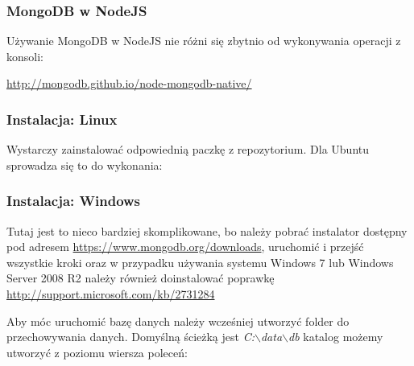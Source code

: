 \documentclass{beamer}
\begin{document}
  \begin{frame}
    \frametitle{MongoDB w NodeJS}
    Używanie MongoDB w NodeJS nie różni się zbytnio od wykonywania operacji z konsoli:
    
    \url{http://mongodb.github.io/node-mongodb-native/}
  \end{frame}

  \begin{frame}
    \frametitle{Instalacja: Linux}
    Wystarczy zainstalować odpowiednią paczkę z repozytorium. Dla Ubuntu sprowadza się to do wykonania:

    
  \end{frame}

  \begin{frame}
    \frametitle{Instalacja: Windows}
	Tutaj jest to nieco bardziej skomplikowane, bo należy pobrać instalator dostępny pod adresem \url{https://www.mongodb.org/downloads}, uruchomić i przejść wszystkie kroki oraz w przypadku używania systemu Windows 7 lub Windows Server 2008 R2 należy również doinstalować poprawkę \url{http://support.microsoft.com/kb/2731284}
	
	Aby móc uruchomić bazę danych należy wcześniej utworzyć folder do przechowywania danych. Domyślną ścieżką jest \emph{C:$\backslash$data$\backslash$db} katalog możemy utworzyć z poziomu wiersza poleceń:
	
	 
  \end{frame}
\end{document}
